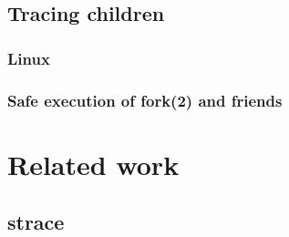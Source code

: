 \documentclass[a4paper, twoside, 10pt, twocolumn]{report}
\begin{document}

\section{Tracing children}

\subsection{Linux}
%

\subsection{Safe execution of fork(2) and friends}


\chapter{Related work}

\section{strace}

\end{document}
